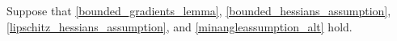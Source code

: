 Suppose that \cref{bounded_gradients_lemma}, \cref{bounded_hessians_assumption}, \cref{lipschitz_hessians_assumption}, and \cref{minangleassumption_alt} hold.
